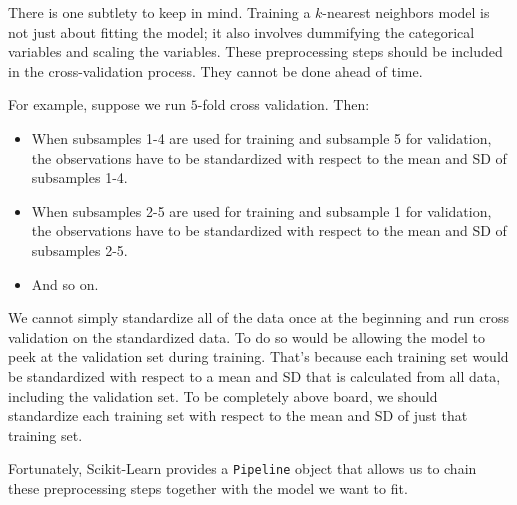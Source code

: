 \documentclass[11pt]{article}
\providecommand{\tightlist}{%
      \setlength{\itemsep}{0pt}\setlength{\parskip}{0pt}}
\begin{document}
There is one subtlety to keep in mind. Training a \(k\)-nearest
neighbors model is not just about fitting the model; it also involves
dummifying the categorical variables and scaling the variables. These
preprocessing steps should be included in the cross-validation process.
They cannot be done ahead of time.

For example, suppose we run \(5\)-fold cross validation. Then:

\begin{itemize}
\tightlist
\item
  When subsamples 1-4 are used for training and subsample 5 for
  validation, the observations have to be standardized with respect to
  the mean and SD of subsamples 1-4.
\item
  When subsamples 2-5 are used for training and subsample 1 for
  validation, the observations have to be standardized with respect to
  the mean and SD of subsamples 2-5.
\item
  And so on.
\end{itemize}

We cannot simply standardize all of the data once at the beginning and
run cross validation on the standardized data. To do so would be
allowing the model to peek at the validation set during training. That's
because each training set would be standardized with respect to a mean
and SD that is calculated from all data, including the validation set.
To be completely above board, we should standardize each training set
with respect to the mean and SD of just that training set.

Fortunately, Scikit-Learn provides a \texttt{Pipeline} object that
allows us to chain these preprocessing steps together with the model we
want to fit.
\end{document}
